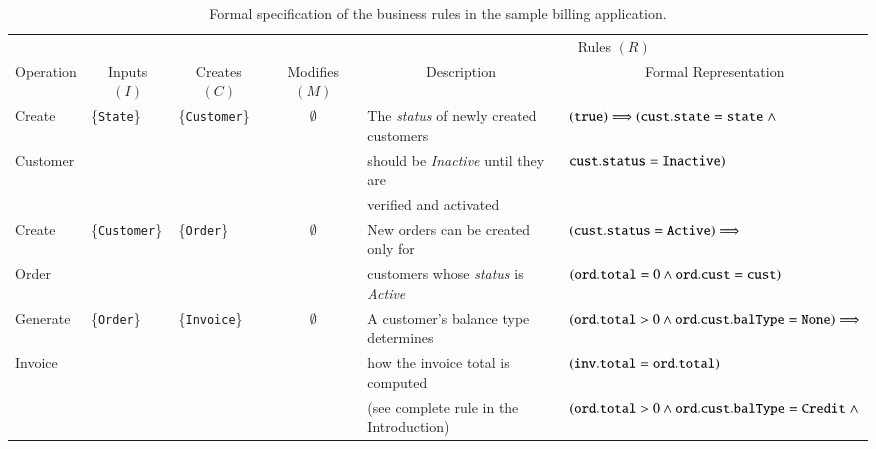 \begin{table}[t]
\caption{Formal specification of the business rules in the sample billing application.}
\centering
\tabcolsep=4pt
{\scriptsize
\begin{tabular}{|l|l|l|l|l|l|}
\hline
& & & & \multicolumn{2}{|c|}{Rules $(R)$} \\
\cline{5-6}
\multicolumn{1}{|c|}{Operation} &
\multicolumn{1}{|c|}{Inputs $(I)$} &
\multicolumn{1}{|c|}{Creates $(C)$} &
\multicolumn{1}{|c|}{Modifies $(M)$} &
\multicolumn{1}{|c|}{Description} &
\multicolumn{1}{|c|}{Formal Representation} \\
\hline \hline
Create & \{{\tt State}\} & \{{\tt Customer}\} &
\multicolumn{1}{|c|}{$\emptyset$} &
The \textit{status} of newly created customers &
$({\tt true}) \Longrightarrow ({\tt cust.state} = {\tt state} \; \wedge$ \\
Customer& & & & should be \textit{Inactive} until they are &
\hspace*{10pt}${\tt cust.status} = {\tt Inactive})$ \\
& & & & verified and activated &  \\
\hline
Create & \{{\tt Customer}\} & \{{\tt Order}\} &
\multicolumn{1}{|c|}{$\emptyset$} &
New orders can be created only for &
$({\tt cust.status} = {\tt Active}) \Longrightarrow$ \\
Order & & & & customers whose \textit{status} is \textit{Active} &
\hspace*{10pt}$({\tt ord.total} = 0 \wedge
{\tt ord.cust} = {\tt cust})$ \\
\hline
Generate & \{{\tt Order}\} & \{{\tt Invoice}\} &
\multicolumn{1}{|c|}{$\emptyset$} &
A customer's balance type determines &
$({\tt ord.total} > 0 \wedge {\tt ord.cust.balType} = {\tt None}) \Longrightarrow$ \\
Invoice & & & & how the invoice total is computed &
\hspace*{10pt}$({\tt inv.total} = {\tt ord.total})$ \\
& & & & (see complete rule in the Introduction) &
$({\tt ord.total} > 0 \wedge {\tt ord.cust.balType} = {\tt Credit} \; \wedge$ \\

\end{tabular}}
\end{table}
